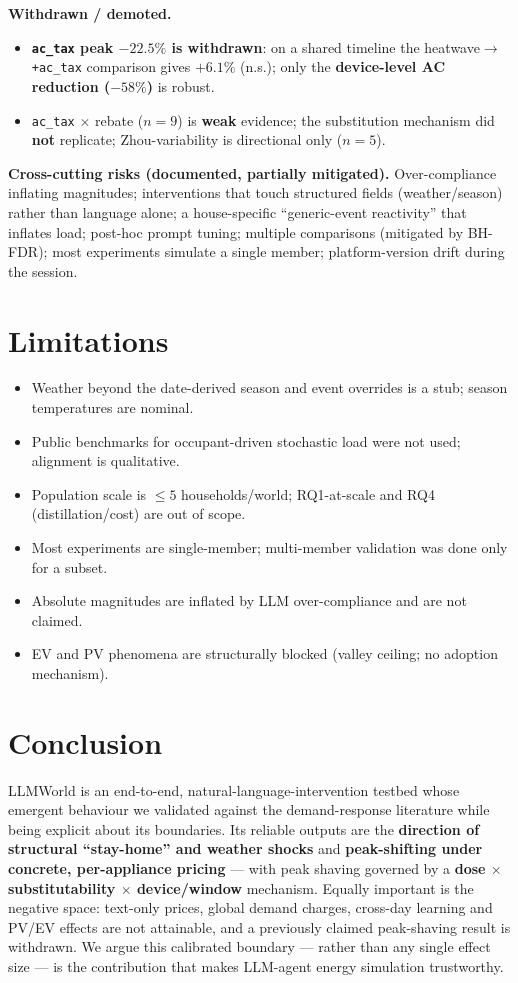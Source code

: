 \documentclass[11pt]{article}
\begin{document}
\noindent\textbf{Withdrawn / demoted.}
\begin{itemize}
\item \textbf{\texttt{ac\_tax} peak $-22.5\%$ is withdrawn}: on a shared timeline the heatwave$\rightarrow$%
\texttt{+ac\_tax} comparison gives $+6.1\%$ (n.s.); only the \textbf{device-level AC reduction ($-58\%$)}
is robust.
\item \texttt{ac\_tax} $\times$ rebate ($n=9$) is \textbf{weak} evidence; the substitution mechanism did
\textbf{not} replicate; Zhou-variability is directional only ($n=5$).
\end{itemize}

\noindent\textbf{Cross-cutting risks (documented, partially mitigated).} Over-compliance inflating
magnitudes; interventions that touch structured fields (weather/season) rather than language alone; a
house-specific ``generic-event reactivity'' that inflates load; post-hoc prompt tuning; multiple
comparisons (mitigated by BH-FDR); most experiments simulate a single member; platform-version drift
during the session.

\section{Limitations}
\begin{itemize}
\item Weather beyond the date-derived season and event overrides is a stub; season temperatures are nominal.
\item Public benchmarks for occupant-driven stochastic load were not used; alignment is qualitative.
\item Population scale is $\le 5$ households/world; RQ1-at-scale and RQ4 (distillation/cost) are out of scope.
\item Most experiments are single-member; multi-member validation was done only for a subset.
\item Absolute magnitudes are inflated by LLM over-compliance and are not claimed.
\item EV and PV phenomena are structurally blocked (valley ceiling; no adoption mechanism).
\end{itemize}

\section{Conclusion}
LLMWorld is an end-to-end, natural-language-intervention testbed whose emergent behaviour we validated
against the demand-response literature while being explicit about its boundaries. Its reliable outputs are
the \textbf{direction of structural ``stay-home'' and weather shocks} and \textbf{peak-shifting under
concrete, per-appliance pricing} --- with peak shaving governed by a \textbf{dose $\times$ substitutability
$\times$ device/window} mechanism. Equally important is the negative space: text-only prices, global
demand charges, cross-day learning and PV/EV effects are not attainable, and a previously claimed
peak-shaving result is withdrawn. We argue this calibrated boundary --- rather than any single effect size
--- is the contribution that makes LLM-agent energy simulation trustworthy.
\end{document}
